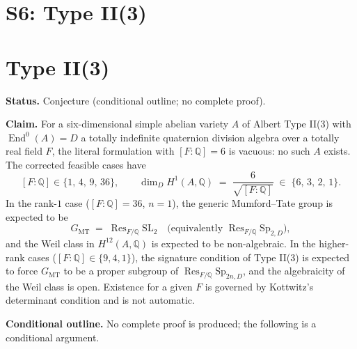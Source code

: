 \documentclass{article}
\begin{document}
\section{S6: Type II(3)}
\section{Type II(3)}\label{sec:type-II-3}

\medskip
\noindent\textbf{Status.} Conjecture (conditional outline; no complete proof).

\medskip
\noindent\textbf{Claim.}
For a six-dimensional simple abelian variety $A$ of Albert Type II(3) with
$\operatorname{End}^0(A) = D$ a totally indefinite quaternion division algebra
over a totally real field $F$, the literal formulation with $[F:\mathbb{Q}] = 6$
is vacuous: no such $A$ exists. The corrected feasible cases have
\[
[F:\mathbb{Q}] \in \{1,\,4,\,9,\,36\},
\qquad
\dim_D H^1(A,\mathbb{Q}) \;=\; \frac{6}{\sqrt{[F:\mathbb{Q}]}} \;\in\; \{6,\,3,\,2,\,1\}.
\]
In the rank-$1$ case ($[F:\mathbb{Q}] = 36$, $n = 1$), the generic Mumford--Tate
group is expected to be
\[
G_{\mathrm{MT}} \;=\; \operatorname{Res}_{F/\mathbb{Q}} \mathrm{SL}_2
\quad\bigl(\text{equivalently } \operatorname{Res}_{F/\mathbb{Q}} \mathrm{Sp}_{2,D}\bigr),
\]
and the Weil class in $H^{12}(A,\mathbb{Q})$ is expected to be non-algebraic.
In the higher-rank cases ($[F:\mathbb{Q}] \in \{9,4,1\}$), the signature condition
of Type II(3) is expected to force $G_{\mathrm{MT}}$ to be a proper subgroup of
$\operatorname{Res}_{F/\mathbb{Q}} \mathrm{Sp}_{2n,D}$, and the algebraicity of the
Weil class is open. Existence for a given $F$ is governed by Kottwitz's determinant
condition and is not automatic.

\medskip
\noindent\textbf{Conditional outline.}
No complete proof is produced; the following is a conditional argument.
\end{document}
